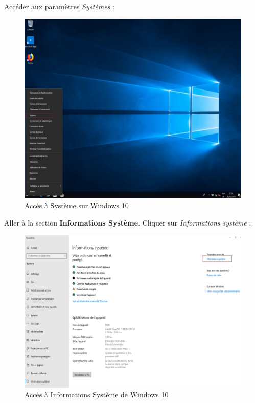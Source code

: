 Accéder aux paramètres \textit{Systèmes} :
\begin{figure}[h!]
	\begin{center}
		\includegraphics[scale=0.6]{W_Screenshots/46.png}
		\caption{Accès à Système sur Windows 10}
		\label{W_Screenshots/46}
	\end{center}
\end{figure}
\FloatBarrier

\newpage
Aller à la section \textbf{Informations Système}. Cliquer sur \textit{Informations système} :
\begin{figure}[h!]
	\begin{center}
		\includegraphics[scale=0.6]{W_Screenshots/47.png}
		\caption{Accès à Informations Système de Windows 10}
		\label{W_Screenshots/47}
	\end{center}
\end{figure}
\FloatBarrier


